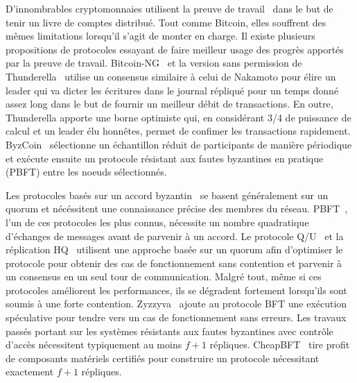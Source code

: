 {D'innombrables cryptomonnaies utilisent la preuve de travail~\cite{DworkN92, aspnes2005exposing} dans le but de tenir
un livre de comptes distribué. Tout comme Bitcoin, elles souffrent des mêmes limitations lorsqu'il s'agit de monter en
charge. Il existe plusieurs propositions de protocoles essayant de faire meilleur usage des progrès apportés par la
preuve de travail. Bitcoin-NG~\cite{EyalGSR16} et la version sans permission de Thunderella~\cite{PassS18} utilise
un consensus similaire à celui de Nakamoto pour élire un leader qui va dicter les écritures dans le journal répliqué
pour un temps donné assez long dans le but de fournir un meilleur débit de transactions. En outre, Thunderella apporte
une borne optimiste qui, en considérant 3/4 de puissance de calcul et un leader élu honnêtes, permet de confimer les
transactions rapidement. ByzCoin~\cite{Kokoris-KogiasJ16} sélectionne un échantillon réduit de participants de manière
périodique et exécute ensuite un protocole résistant aux fautes byzantines en pratique (PBFT) entre les noeuds
sélectionnés.


Les protocoles basés sur un accord byzantin~\cite{PeaseSL80, LamportSP82} se basent généralement sur un quorum et
nécéssitent une connaissance précise des membres du réseau. PBFT~\cite{castro1999practical, CL02}, l'un de ces
protocoles les plus connus, nécessite un nombre quadratique d'échanges de messages avant de parvenir à un accord.
Le protocole Q/U~\cite{abd2005fault} et la réplication HQ~\cite{cowling2006hq} utilisent une approche basée sur un
quorum afin d'optimiser le protocole pour obtenir des cas de fonctionnement sans contention et parvenir à un consensus
en un seul tour de communication. Malgré tout, même si ces protocoles améliorent les performances, ils se dégradent
fortement lorsqu'ils sont soumis à une forte contention. Zyzzyva~\cite{KotlaADCW09} ajoute au protocole BFT une
exécution spéculative pour tendre vers un cas de fonctionnement sans erreurs. Les travaux passés portant sur les
systèmes résistants aux fautes byzantines avec contrôle d'accès nécessitent typiquement au moins $f+1$ répliques.
CheapBFT~\cite{kapitza2012cheapbft} tire profit de composants matériels certifiés pour construire un protocole
nécessitant exactement $f+1$ répliques.

}
